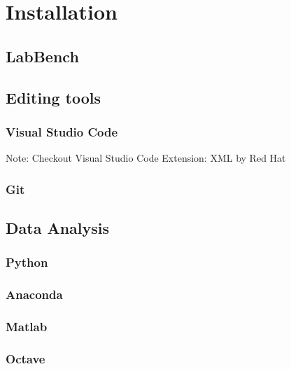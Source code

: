 \chapter{Installation}
\label{ch:Installation}

\section{LabBench}


\section{Editing tools}

\subsection{Visual Studio Code}

Note: Checkout Visual Studio Code Extension: XML by Red Hat 

\subsection{Git}

\section {Data Analysis}

\subsection{Python}

\subsection{Anaconda}

\subsection{Matlab}

\subsection{Octave}
